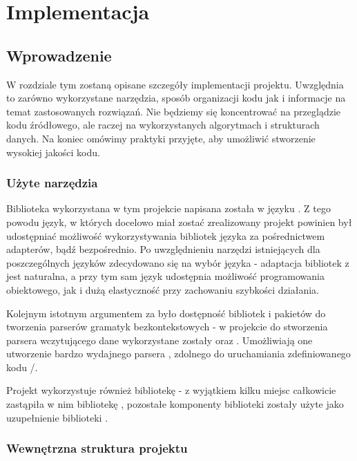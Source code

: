 \documentclass[polish]{standalone}
\begin{document}
\pagestyle{headings}

\chapter{Implementacja}

\section{Wprowadzenie}

W rozdziale tym zostaną opisane szczegóły implementacji projektu. Uwzględnia to zarówno wykorzystane narzędzia, sposób
organizacji kodu jak i informacje na temat zastosowanych rozwiązań. Nie będziemy się koncentrować na przeglądzie kodu
źródłowego, ale raczej na wykorzystanych algorytmach i strukturach danych. Na koniec omówimy praktyki przyjęte, aby
umożliwić stworzenie wysokiej jakości kodu.

\subsection{Użyte narzędzia}

Biblioteka  wykorzystana w tym projekcie napisana została w języku . Z tego powodu język, w których
docelowo miał zostać zrealizowany projekt powinien był udostępniać możliwość wykorzystywania bibliotek języka 
za pośrednictwem adapterów, bądź bezpośrednio. Po uwzględnieniu narzędzi istniejących dla poszczególnych języków
zdecydowano się na wybór języka  - adaptacja bibliotek z  jest naturalna, a przy tym sam język
udostępnia możliwość programowania obiektowego, jak i dużą elastyczność przy zachowaniu szybkości działania.

Kolejnym istotnym argumentem za  było dostępność bibliotek i pakietów do tworzenia parserów gramatyk
bezkontekstowych - w projekcie do stworzenia parsera wczytującego dane wykorzystane zostały  oraz
. Umożliwiają one utworzenie bardzo wydajnego parsera , zdolnego do uruchamiania
zdefiniowanego kodu /.

Projekt wykorzystuje również bibliotekę  - z wyjątkiem kilku miejsc  całkowicie
zastąpiła w nim bibliotekę , pozostałe komponenty biblioteki  zostały użyte jako uzupełnienie
biblioteki .

\subsection{Wewnętrzna struktura projektu}
\end{document}
